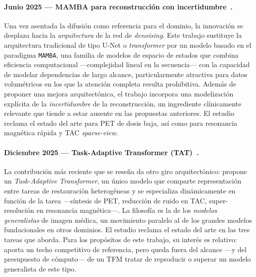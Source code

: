\paragraph{Junio 2025 — MAMBA para reconstrucción con
incertidumbre~\cite{mamba2025}.} Una vez asentada la difusión como
referencia para el dominio, la innovación se desplaza hacia la
\emph{arquitectura} de la red de \textit{denoising}. Este trabajo
sustituye la arquitectura tradicional de tipo U-Net o
\textit{transformer} por un modelo basado en el paradigma
\texttt{MAMBA}, una familia de modelos de espacio de estados que
combina eficiencia computacional —complejidad lineal en la
secuencia— con la capacidad de modelar dependencias de largo
alcance, particularmente atractiva para datos volumétricos en los
que la atención completa resulta prohibitiva. Además de proponer
una mejora arquitectónica, el trabajo incorpora una modelización
explícita de la \emph{incertidumbre} de la reconstrucción, un
ingrediente clínicamente relevante que tiende a estar ausente en
las propuestas anteriores. El estudio reclama el estado del arte
para PET de dosis baja, así como para resonancia magnética rápida
y TAC \textit{sparse-view}.

\paragraph{Diciembre 2025 — Task-Adaptive Transformer
(TAT)~\cite{tat2025}.} La contribución más reciente que se reseña
da otro giro arquitectónico: propone un \emph{Task-Adaptive
Transformer}, un único modelo que comparte representación entre
tareas de restauración heterogéneas y se especializa
dinámicamente en función de la tarea —síntesis de PET, reducción
de ruido en TAC, super-resolución en resonancia magnética—. La
filosofía es la de los \emph{modelos generalistas} de imagen
médica, un movimiento paralelo al de los grandes modelos
fundacionales en otros dominios. El estudio reclama el estado del
arte en las tres tareas que aborda. Para los propósitos de este
trabajo, su interés es relativo: aporta un techo competitivo de
referencia, pero queda fuera del alcance —y del presupuesto de
cómputo— de un TFM tratar de reproducir o superar un modelo
generalista de este tipo.

